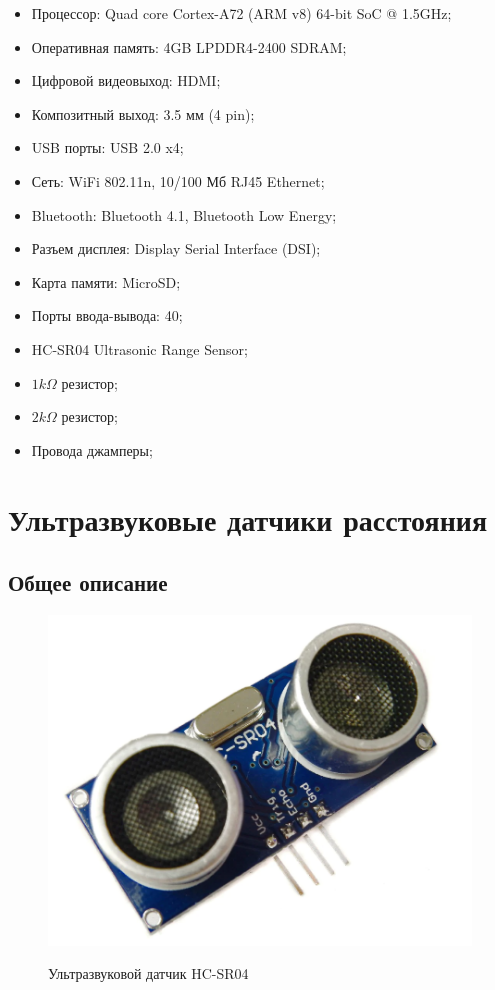 \documentclass[a4paper, 14pt]{article}
\begin{document}
\begin{itemize}
	\item Процессор: Quad core Cortex-A72 (ARM v8) 64-bit SoC @ 1.5GHz;
	\item Оперативная память: 4GB LPDDR4-2400 SDRAM;
	\item Цифровой видеовыход: HDMI;
	\item Композитный выход: 3.5 мм (4 pin);
	\item USB порты: USB 2.0 x4;
	\item Сеть: WiFi 802.11n, 10/100 Мб RJ45 Ethernet;
	\item Bluetooth: Bluetooth 4.1, Bluetooth Low Energy;
	\item Разъем дисплея: Display Serial Interface (DSI);
	\item Карта памяти: MicroSD;
	\item Порты ввода-вывода: 40;
	\item HC-SR04 Ultrasonic Range Sensor;
	\item $1k\Omega$ резистор;
	\item $2k\Omega$ резистор;
	\item Провода джамперы;
\end{itemize}

\newpage
\section{Ультразвуковые датчики расстояния}

\subsection{Общее описание}

\begin{figure}[H]
	\centering
	\includegraphics[width=15cm]{screenshots/1.png}\\
	\caption{Ультразвуковой датчик HC-SR04}
\end{figure}
\end{document}
